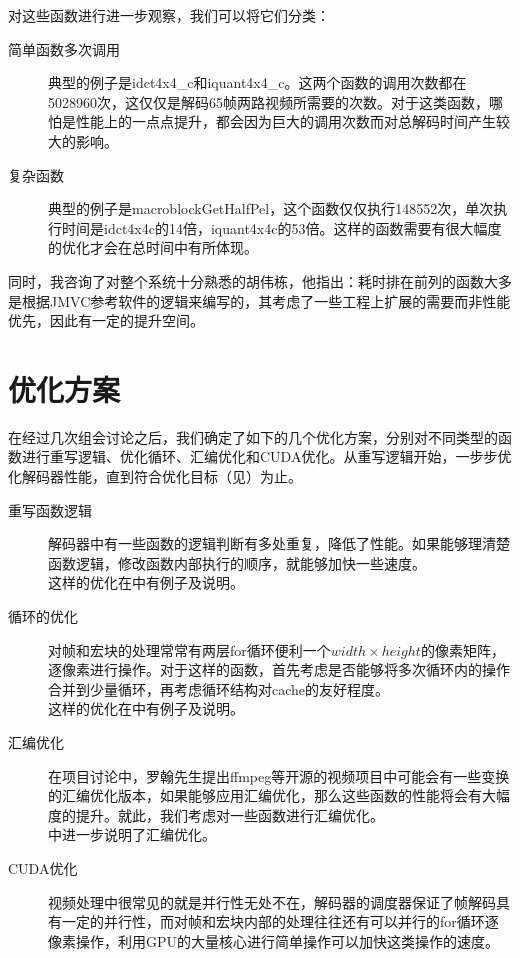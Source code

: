 对这些函数进行进一步观察，我们可以将它们分类：
\begin{description}
\item[简单函数多次调用] 典型的例子是idct4x4\_c和iquant4x4\_c。这两个函数的调用次数都在5028960次，这仅仅是解码65帧两路视频所需要的次数。对于这类函数，哪怕是性能上的一点点提升，都会因为巨大的调用次数而对总解码时间产生较大的影响。
\item[复杂函数] 典型的例子是macroblockGetHalfPel，这个函数仅仅执行148552次，单次执行时间是idct4x4c的14倍，iquant4x4c的53倍。这样的函数需要有很大幅度的优化才会在总时间中有所体现。
\end{description}

同时，我咨询了对整个系统十分熟悉的胡伟栋，他指出：耗时排在前列的函数大多是根据JMVC参考软件的逻辑来编写的，其考虑了一些工程上扩展的需要而非性能优先，因此有一定的提升空间。

\section{优化方案}
\label{sec:optapproach}

在经过几次组会讨论之后，我们确定了如下的几个优化方案，分别对不同类型的函数进行重写逻辑、优化循环、汇编优化和CUDA优化。从重写逻辑开始，一步步优化解码器性能，直到符合优化目标（见）为止。

\begin{description}
\item[重写函数逻辑] 解码器中有一些函数的逻辑判断有多处重复，降低了性能。如果能够理清楚函数逻辑，修改函数内部执行的顺序，就能够加快一些速度。\\这样的优化在中有例子及说明。
\item[循环的优化] 对帧和宏块的处理常常有两层for循环便利一个$width\times height$的像素矩阵，逐像素进行操作。对于这样的函数，首先考虑是否能够将多次循环内的操作合并到少量循环，再考虑循环结构对cache的友好程度。\\这样的优化在中有例子及说明。
\item[汇编优化] 在项目讨论中，罗翰先生提出ffmpeg等开源的视频项目中可能会有一些变换的汇编优化版本，如果能够应用汇编优化，那么这些函数的性能将会有大幅度的提升。就此，我们考虑对一些函数进行汇编优化。\\ 中进一步说明了汇编优化。
\item[CUDA优化] 视频处理中很常见的就是并行性无处不在，解码器的调度器保证了帧解码具有一定的并行性，而对帧和宏块内部的处理往往还有可以并行的for循环逐像素操作，利用GPU的大量核心进行简单操作可以加快这类操作的速度。
\end{description}

